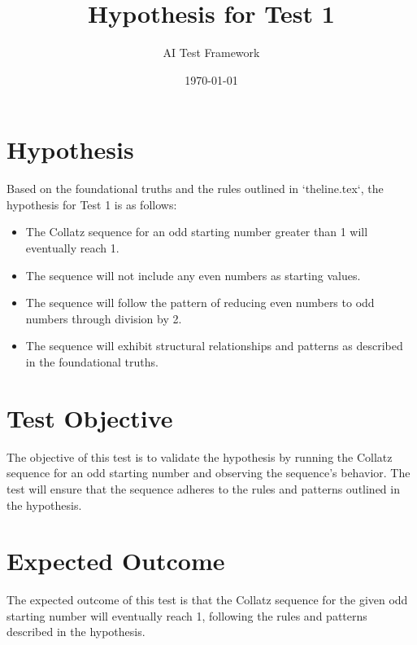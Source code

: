 \documentclass[11pt]{article}
\title{\textbf{Hypothesis for Test 1}}
\author{AI Test Framework}
\date{\today}
\begin{document}
\maketitle

\section*{\textbf{Hypothesis}}

Based on the foundational truths and the rules outlined in `theline.tex`, the hypothesis for Test 1 is as follows:

\begin{itemize}
    \item The Collatz sequence for an odd starting number greater than 1 will eventually reach 1.
    \item The sequence will not include any even numbers as starting values.
    \item The sequence will follow the pattern of reducing even numbers to odd numbers through division by 2.
    \item The sequence will exhibit structural relationships and patterns as described in the foundational truths.
\end{itemize}

\section*{\textbf{Test Objective}}

The objective of this test is to validate the hypothesis by running the Collatz sequence for an odd starting number and observing the sequence's behavior. The test will ensure that the sequence adheres to the rules and patterns outlined in the hypothesis.

\section*{\textbf{Expected Outcome}}

The expected outcome of this test is that the Collatz sequence for the given odd starting number will eventually reach 1, following the rules and patterns described in the hypothesis.
\end{document}
